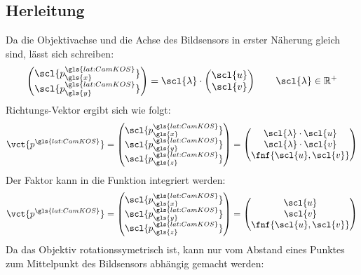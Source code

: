 \subsection{Herleitung}
Da die Objektivachse und die Achse des Bildsensors in erster Näherung gleich sind, lässt sich schreiben:
\begin{equation}
\begin{pmatrix}
\scl{p^{\gls{lat:CamKOS}}_{\gls{x}}} \\ \scl{p^{\gls{lat:CamKOS}}_{\gls{y}}}
\end{pmatrix}
= \scl{\lambda} \cdot
\begin{pmatrix}
\scl{u} \\ \scl{v}
\end{pmatrix}
\qquad
\scl{\lambda} \in \mathbb{R}^+
\end{equation}
Richtungs-Vektor  ergibt sich wie folgt: 
\begin{equation}
\vct{p^{\gls{lat:CamKOS}}} =
\begin{pmatrix}
\scl{p^{\gls{lat:CamKOS}}_{\gls{x}}} \\ \scl{p^{\gls{lat:CamKOS}}_{\gls{y}}} \\ \scl{p^{\gls{lat:CamKOS}}_{\gls{z}}}
\end{pmatrix}
=
\begin{pmatrix}
\scl{\lambda} \cdot \scl{u} \\  \scl{\lambda} \cdot \scl{v} \\ \fnf{\scl{u},\scl{v}}
\end{pmatrix}
\end{equation}
Der Faktor  \scl{\lambda} kann in die Funktion  integriert werden:
\begin{equation}
\label{eq:ocamcalibuv}
\vct{p^{\gls{lat:CamKOS}}} =
\begin{pmatrix}
\scl{p^{\gls{lat:CamKOS}}_{\gls{x}}} \\ \scl{p^{\gls{lat:CamKOS}}_{\gls{y}}} \\ \scl{p^{\gls{lat:CamKOS}}_{\gls{z}}}
\end{pmatrix}
=
\begin{pmatrix}
\scl{u} \\ \scl{v} \\ \fnf{\scl{u},\scl{v}}
\end{pmatrix}
\end{equation}
Da das Objektiv rotationssymetrisch ist, kann  nur vom Abstand eines Punktes zum Mittelpunkt des Bildsensors abhängig gemacht werden:
